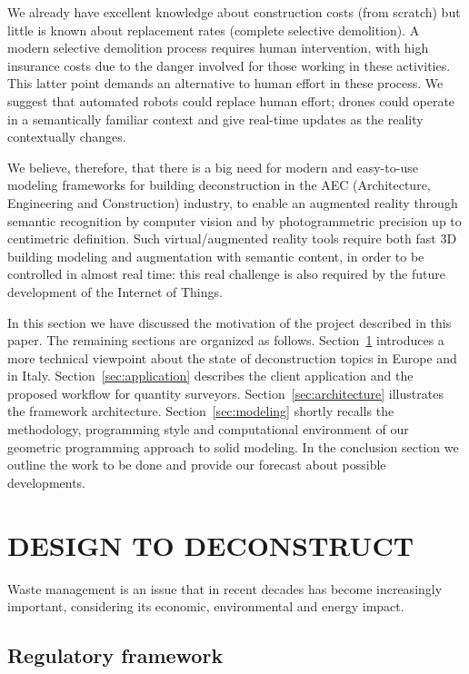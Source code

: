 \documentclass[a4paper,twoside]{article}
\begin{document}
We already have excellent knowledge about construction costs (from scratch) but little is known about replacement rates (complete selective demolition). A modern selective demolition process requires human intervention, with high insurance costs due to the danger involved for those working in these activities. This latter point demands an alternative to human effort in these process. We suggest that automated robots could replace human effort; drones could operate in a semantically familiar context and give real-time updates as the reality contextually changes. 

We believe, therefore, that there is a big need for modern and easy-to-use modeling frameworks for building deconstruction in the AEC (Architecture, Engineering and Construction) industry, to enable an augmented reality through semantic recognition by computer vision and by photogrammetric precision up to centimetric definition. Such virtual/augmented reality tools require both fast 3D building modeling and augmentation with semantic content, in order to be controlled in almost real time: this real challenge is also required by the future development of the Internet of Things. 	  
 
In this section we have discussed the motivation of the project described in this paper. The remaining sections are organized as follows.
Section~\ref{sec:deconstruction} introduces a more technical viewpoint about the state of deconstruction topics in Europe and in Italy.
Section~\ref{sec:application} describes the client application and the proposed workflow for quantity surveyors.
Section~\ref{sec:architecture} illustrates the framework architecture. 
Section~\ref{sec:modeling} shortly recalls the methodology, programming style and computational environment of our geometric programming approach to solid modeling.
In the conclusion section we outline the work to be done and provide our forecast about possible developments.


% 
\section{\uppercase{Design to Deconstruct}}
\label{sec:deconstruction}

\noindent 
Waste management is an issue that in recent decades has become increasingly important, considering its economic, environmental and energy  impact.

\subsection{Regulatory framework}
\label{sec:CER}
\end{document}
